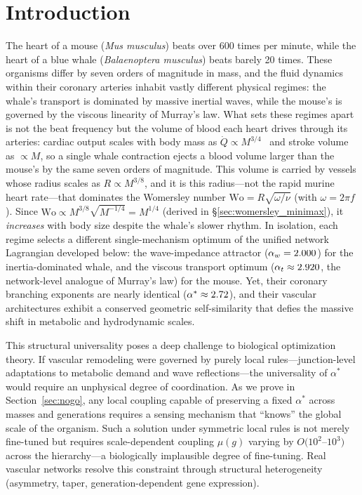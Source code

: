 \section{Introduction}

The heart of a mouse (\textit{Mus musculus}) beats over 600 times per minute,
while the heart of a blue whale (\textit{Balaenoptera musculus}) beats barely 20
times. These organisms differ by seven orders of magnitude in mass, and the
fluid dynamics within their coronary arteries inhabit vastly different physical
regimes: the whale's transport is dominated by massive inertial waves, while the
mouse's is governed by the viscous linearity of Murray's law. What sets
these regimes apart is not the beat frequency but the volume of blood each heart
drives through its arteries: cardiac output scales with body mass as $\dot{Q}
\propto M^{3/4}$~\cite{noujaim2004} and stroke volume as $\propto M$, so a
single whale contraction ejects a blood volume larger than the mouse's by the
same seven orders of magnitude. This volume is carried by vessels whose radius
scales as $R \propto M^{3/8}$, and it is this radius---not the rapid murine
heart rate---that dominates the Womersley number $\mathrm{Wo} =
R\sqrt{\omega/\nu}$ (with $\omega = 2\pi f$). Since $\mathrm{Wo} \propto
M^{3/8}\sqrt{M^{-1/4}} = M^{1/4}$ (derived in \S\ref{sec:womersley_minimax}), it
\emph{increases} with body size despite the whale's slower rhythm. In
isolation, each regime selects a different single-mechanism optimum of the
unified network Lagrangian developed below: the wave-impedance attractor
($\alpha_w = 2.000$) for the inertia-dominated whale, and the viscous
transport optimum ($\alpha_t \approx 2.920$, the network-level analogue of
Murray's law) for the mouse. Yet, their coronary branching exponents are nearly
identical ($\alpha^* \approx 2.72$), and their vascular architectures
exhibit a conserved geometric self-similarity that defies the massive shift in
metabolic and hydrodynamic scales.

This structural universality poses a deep challenge to biological optimization
theory. If vascular remodeling were governed by purely local
rules---junction-level adaptations to metabolic demand and wave
reflections---the universality of $\alpha^*$ would require an unphysical degree
of coordination. As we prove in Section~\ref{sec:nogo}, any local coupling
capable of preserving a fixed $\alpha^*$ across masses and generations requires
a sensing mechanism that ``knows'' the global scale of the organism. Such a
solution under symmetric local rules is not merely fine-tuned but requires
scale-dependent coupling $\mu(g)$ varying by $O(10^2$--$10^3)$ across the
hierarchy---a biologically implausible degree of fine-tuning. Real vascular
networks resolve this constraint through structural heterogeneity (asymmetry,
taper, generation-dependent gene expression).

